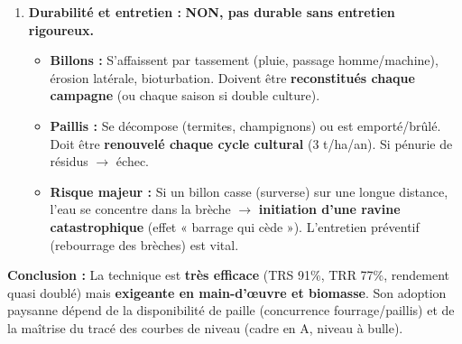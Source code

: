 \documentclass[11pt]{article}
\begin{document}
\begin{exoresolu}
\begin{enumerate}
\begin{itemize}
            \item \textbf{Hydrologie :} Le ruissellement passe de 22,7\% à 5,1\% de la pluie. Les billons + paillis créent une \textbf{rugosité de surface} et un \textbf{stockage temporaire} (micro-bassins) qui favorisent l'infiltration (ruissellement ralenti, temps de contact sol/eau augmenté). L'eau stockée est disponible pour la culture.
            \item \textbf{Pédologie :} L'érosion chute de 91\% (42 $\rightarrow$ 3,8 t/ha/an). La valeur 3,8 t/ha/an reste au-dessus du seuil de tolérance géologique souvent cité (~1–2 t/ha/an pour sols tropicaux profonds), mais représente une amélioration majeure. Le paillis est clé : il absorbe l'énergie cinétique des gouttes (zéro battance) et freine le flux laminaire.
            \item \textbf{Agronomie :} Rendement +81\% (2,1 $\rightarrow$ 3,8 t/ha). Gain dû à : (1) \textbf{Eau} : +325 mm infiltrés (disponibles pour la plante, critique en fin de cycle). (2) \textbf{Nutriments} : Matière organique et éléments minéraux (N, P, K) retenus dans le champ au lieu d'être exportés (42 t de sol perdues = énorme perte de fertilité). (3) \textbf{Structure} : Paillis $\rightarrow$ activité biologique $\rightarrow$ porosité.
        \end{itemize}
        \item \textbf{Durabilité et entretien :} \textbf{NON, pas durable sans entretien rigoureux.}
        \begin{itemize}
            \item \textbf{Billons :} S'affaissent par tassement (pluie, passage homme/machine), érosion latérale, bioturbation. Doivent être \textbf{reconstitués chaque campagne} (ou chaque saison si double culture).
            \item \textbf{Paillis :} Se décompose (termites, champignons) ou est emporté/brûlé. Doit être \textbf{renouvelé chaque cycle cultural} (3 t/ha/an). Si pénurie de résidus $\rightarrow$ échec.
            \item \textbf{Risque majeur :} Si un billon casse (surverse) sur une longue distance, l'eau se concentre dans la brèche $\rightarrow$ \textbf{initiation d'une ravine catastrophique} (effet « barrage qui cède »). L'entretien préventif (rebourrage des brèches) est vital.
        \end{itemize}
    \end{enumerate}
    \textbf{Conclusion :} La technique est \textbf{très efficace} (TRS 91\%, TRR 77\%, rendement quasi doublé) mais \textbf{exigeante en main-d'œuvre et biomasse}. Son adoption paysanne dépend de la disponibilité de paille (concurrence fourrage/paillis) et de la maîtrise du tracé des courbes de niveau (cadre en A, niveau à bulle).
\end{exoresolu}
\end{document}
